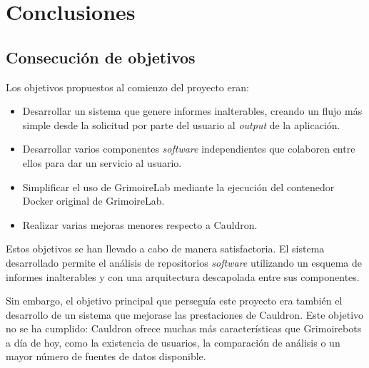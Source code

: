 
\chapter{Conclusiones} %

\label{Chapter5} %


\section{Consecución de objetivos}

Los objetivos propuestos al comienzo del proyecto eran:

\begin{itemize}
    \item Desarrollar un sistema que genere informes inalterables, creando un flujo más simple desde la solicitud por parte del usuario al \emph{output} de la aplicación.
    \item Desarrollar varios componentes \emph{software} independientes que colaboren entre ellos para dar un servicio al usuario.
    \item Simplificar el uso de GrimoireLab mediante la ejecución del contenedor Docker original de GrimoireLab.
    \item Realizar varias mejoras menores respecto a Cauldron.
\end{itemize}

Estos objetivos se han llevado a cabo de manera satisfactoria. El sistema desarrollado permite el análisis de repositorios \emph{software} utilizando un esquema de informes inalterables y con una arquitectura descapolada entre sus componentes.

Sin embargo, el objetivo principal que perseguía este proyecto era también el desarrollo de un sistema que mejorase las prestaciones de Cauldron. Este objetivo no se ha cumplido: Cauldron ofrece muchas más características que Grimoirebots a día de hoy, como la existencia de usuarios, la comparación de análisis o un mayor número de fuentes de datos disponible.


